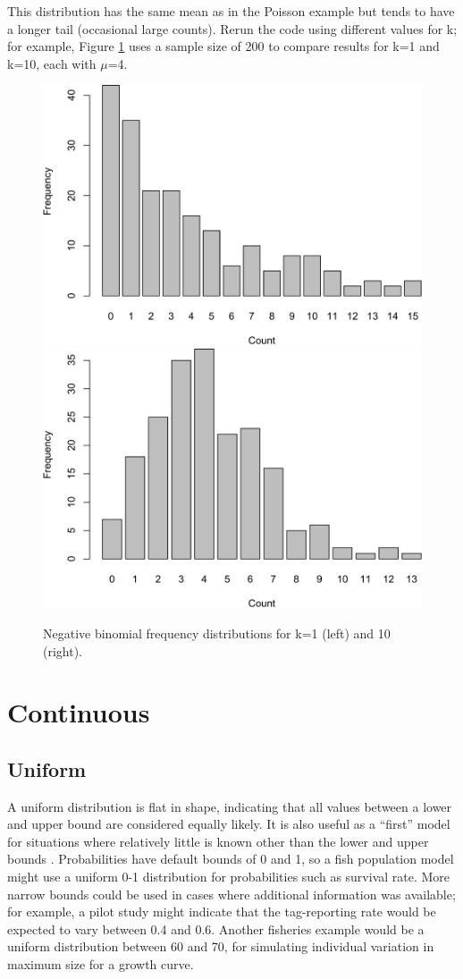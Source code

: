 \documentclass[
]{krantz}
\begin{document}
This distribution has the same mean as in the Poisson example but tends to have a longer tail (occasional large counts). Rerun the code using different values for k; for example, Figure \ref{fig:NB-vary-k} uses a sample size of 200 to compare results for k=1 and k=10, each with \(\mu\)=4.

\begin{figure}
\includegraphics[width=0.5\linewidth]{bookdown_files/figure-latex/NB-vary-k-1} \includegraphics[width=0.5\linewidth]{bookdown_files/figure-latex/NB-vary-k-2} \caption{Negative binomial frequency distributions for k=1 (left) and 10 (right).}\label{fig:NB-vary-k}
\end{figure}

\hypertarget{Continuous}{%
\section{Continuous}\label{Continuous}}

\hypertarget{Uniform}{%
\subsection{Uniform}\label{Uniform}}

A uniform distribution is flat in shape, indicating that all values between a lower and upper bound are considered equally likely. It is also useful as a ``first'' model for situations where relatively little is known other than the lower and upper bounds \citep{law.kelton_1982}. Probabilities have default bounds of 0 and 1, so a fish population model might use a uniform 0-1 distribution for probabilities such as survival rate. More narrow bounds could be used in cases where additional information was available; for example, a pilot study might indicate that the tag-reporting rate would be expected to vary between 0.4 and 0.6. Another fisheries example would be a uniform distribution between 60 and 70, for simulating individual variation in maximum size for a growth curve.
\end{document}
